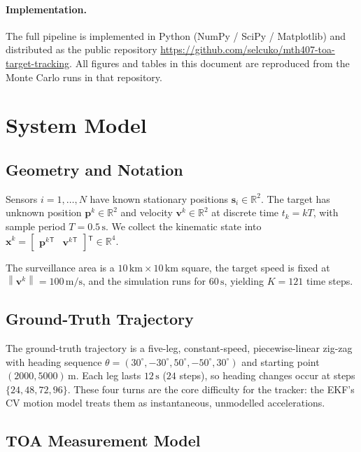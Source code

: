 \documentclass[11pt,a4paper]{article}
\newcommand{\R}{\mathbb{R}}
\newcommand{\norm}[1]{\left\lVert #1 \right\rVert}
\newcommand{\transpose}{{}^{\mathsf{T}}}
\begin{document}
\paragraph{Implementation.}
The full pipeline is implemented in Python (NumPy / SciPy / Matplotlib) and
distributed as the public repository
\url{https://github.com/selcuko/mth407-toa-target-tracking}.  All figures and
tables in this document are reproduced from the Monte Carlo runs in that
repository.

\section{System Model}
\label{sec:system}

\subsection{Geometry and Notation}

Sensors $i = 1, \dots, N$ have known stationary positions
$\mathbf{s}_i \in \R^2$.  The target has unknown position $\mathbf{p}^k \in \R^2$
and velocity $\mathbf{v}^k \in \R^2$ at discrete time $t_k = k T$, with
sample period $T = 0.5\,\mathrm{s}$.  We collect the kinematic state into
$\mathbf{x}^k = \begin{bmatrix} \mathbf{p}^k\transpose & \mathbf{v}^k\transpose \end{bmatrix}\transpose \in \R^4$.

The surveillance area is a $10\,\mathrm{km} \times 10\,\mathrm{km}$ square,
the target speed is fixed at $\norm{\mathbf{v}^k} = 100\,\mathrm{m/s}$, and
the simulation runs for $60\,\mathrm{s}$, yielding $K = 121$ time steps.

\subsection{Ground-Truth Trajectory}

The ground-truth trajectory is a five-leg, constant-speed, piecewise-linear
zig-zag with heading sequence $\theta = (30^\circ, -30^\circ, 50^\circ,
-50^\circ, 30^\circ)$ and starting point $(2000, 5000)\,\mathrm{m}$.  Each
leg lasts $12\,\mathrm{s}$ ($24$ steps), so heading changes occur at steps
$\{24, 48, 72, 96\}$.  These four turns are the core difficulty for the
tracker: the EKF's CV motion model treats them as instantaneous,
unmodelled accelerations.

\subsection{TOA Measurement Model}
\end{document}

